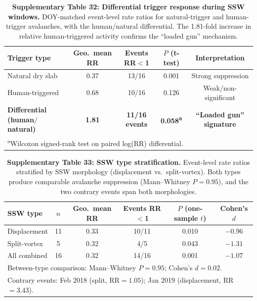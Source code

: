 \documentclass[11pt,letterpaper]{article}
\begin{document}
\begin{table}[htbp]
\centering
\caption{\textbf{Supplementary Table 32: Differential trigger response during SSW windows.} DOY-matched event-level rate ratios for natural-trigger and human-trigger avalanches, with the human/natural differential. The 1.81-fold increase in relative human-triggered activity confirms the ``loaded gun'' mechanism.}
\label{tab:trigger_differential}
\small
\begin{tabular}{lcccc}
\toprule
\textbf{Trigger type} & \textbf{Geo.\ mean RR} & \textbf{Events RR$<$1} & \textbf{$P$ (t-test)} & \textbf{Interpretation} \\
\midrule
Natural dry slab & 0.37 & 13/16 & 0.001 & Strong suppression \\
Human-triggered & 0.68 & 10/16 & 0.126 & Weak/non-significant \\
\midrule
\textbf{Differential (human$/$natural)} & \textbf{1.81} & \textbf{11/16 events} & \textbf{0.058\textsuperscript{a}} & \textbf{``Loaded gun'' signature} \\
\bottomrule
\multicolumn{5}{l}{\footnotesize \textsuperscript{a}Wilcoxon signed-rank test on paired log(RR) differential.} \\
\end{tabular}
\end{table}

\begin{table}[htbp]
\centering
\caption{\textbf{Supplementary Table 33: SSW type stratification.} Event-level rate ratios stratified by SSW morphology (displacement vs.\ split-vortex). Both types produce comparable avalanche suppression (Mann--Whitney $P = 0.95$), and the two contrary events span both morphologies.}
\label{tab:ssw_type}
\small
\begin{tabular}{lccccc}
\toprule
\textbf{SSW type} & \textbf{$n$} & \textbf{Geo.\ mean RR} & \textbf{Events RR$<$1} & \textbf{$P$ (one-sample $t$)} & \textbf{Cohen's $d$} \\
\midrule
Displacement & 11 & 0.33 & 10/11 & 0.010 & $-0.96$ \\
Split-vortex & 5 & 0.32 & 4/5 & 0.043 & $-1.31$ \\
\midrule
All combined & 16 & 0.32 & 14/16 & 0.001 & $-1.07$ \\
\bottomrule
\multicolumn{6}{l}{\footnotesize Between-type comparison: Mann--Whitney $P = 0.95$; Cohen's $d = 0.02$.} \\
\multicolumn{6}{l}{\footnotesize Contrary events: Feb 2018 (split, RR$=1.05$); Jan 2019 (displacement, RR$=3.43$).} \\
\end{tabular}
\end{table}
\end{document}

